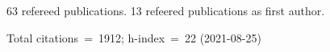 63 refereed publications. 13 refeered publications as first author.

Total citations~=~1912; h-index~=~22 (2021-08-25)